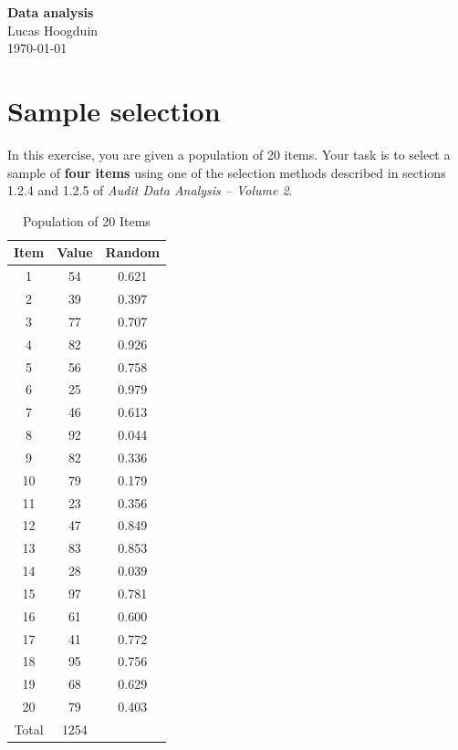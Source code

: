\documentclass[11pt,a4paper,openany]{memoir}
\begin{document}
\thispagestyle{empty}
\begin{center}
    \vspace*{2in}
    {\Huge \textbf{Data analysis}} \\
    \vspace{0.5in}
    {\Large Lucas Hoogduin} \\
    \vspace{0.5in}
    {\large \today}
\end{center}
\newpage

\tableofcontents
\newpage

\chapter{Sample selection}

In this exercise, you are given a population of 20 items. Your task is to select a sample of \textbf{four items} using one of the selection methods described in sections 1.2.4 and 1.2.5 of \emph{Audit Data Analysis -- Volume 2}.

\begin{table}[htbp]
\centering
\caption{Population of 20 Items}
\label{tab:population_20_items}
\begin{tabularx}{\textwidth}{@{}ccc@{}}
\toprule
\textbf{Item} & \textbf{Value} & \textbf{Random} \\
\midrule
1  & 54 & 0.621 \\
2  & 39 & 0.397 \\
3  & 77 & 0.707 \\
4  & 82 & 0.926 \\
5  & 56 & 0.758 \\
6  & 25 & 0.979 \\
7  & 46 & 0.613 \\
8  & 92 & 0.044 \\
9  & 82 & 0.336 \\
10 & 79 & 0.179 \\
11 & 23 & 0.356 \\
12 & 47 & 0.849 \\
13 & 83 & 0.853 \\
14 & 28 & 0.039 \\
15 & 97 & 0.781 \\
16 & 61 & 0.600 \\
17 & 41 & 0.772 \\
18 & 95 & 0.756 \\
19 & 68 & 0.629 \\
20 & 79 & 0.403 \\
\midrule
Total & 1254 & \\
\bottomrule
\end{tabularx}
\end{table}
\end{document}
